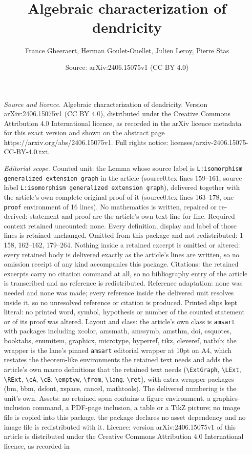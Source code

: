 \documentclass[10pt,a4paper]{amsart}
\title[Algebraic characterization of dendricity]{Algebraic characterization of dendricity}
\author{France Gheeraert, Herman Goulet-Ouellet, Julien Leroy, Pierre Stas}
\date{Source: arXiv:2406.15075v1 (CC BY 4.0)}
\begin{document}
\maketitle

\noindent\emph{Source and licence.} Algebraic characterization of dendricity. Version arXiv:2406.15075v1 (CC BY 4.0), distributed under the Creative Commons Attribution 4.0 International licence, as recorded in the arXiv licence metadata for this exact version and shown on the abstract page https://arxiv.org/abs/2406.15075v1. Full rights notice: licenses/arxiv-2406.15075-CC-BY-4.0.txt.\par\smallskip

\noindent\textit{Editorial scope.} Counted unit: the Lemma whose source label is \texttt{L:isomorphism generalized extension graph} in the article (source0.tex lines 159--161, source label \texttt{L:isomorphism generalized extension graph}), delivered together with the article's own complete original proof of it (source0.tex lines 163--178, one \texttt{proof} environment of 16 lines). No mathematics is written, repaired or re-derived: statement and proof are the article's own text line for line. Required context retained uncounted: none. Every definition, display and label of those lines is retained unchanged. Omitted from this package and not redistributed: 1--158, 162--162, 179--264. Nothing inside a retained excerpt is omitted or altered: every retained body is delivered exactly as the article's lines are written, so no omission receipt of any kind accompanies this package. Citations: the retained excerpts carry no citation command at all, so no bibliography entry of the article is transcribed and no reference is redistributed. Reference adaptation: none was needed and none was made; every reference inside the delivered unit resolves inside it, so no unresolved reference or citation is produced. Printed slips kept literal: no printed word, symbol, hypothesis or number of the counted statement or of its proof was altered. Layout and class: the article's own class is \texttt{amsart} with packages including xcolor, amsmath, amssymb, amsthm, doi, csquotes, booktabs, enumitem, graphicx, microtype, hyperref, tikz, cleveref, natbib; the wrapper is the lane's pinned \texttt{amsart} editorial wrapper at 10pt on A4, which restates the theorem-like environments the retained text needs and adds the article's own macro definitions that the retained text needs (\texttt{\textbackslash ExtGraph}, \texttt{\textbackslash LExt}, \texttt{\textbackslash RExt}, \texttt{\textbackslash cA}, \texttt{\textbackslash cB}, \texttt{\textbackslash emptyw}, \texttt{\textbackslash from}, \texttt{\textbackslash lang}, \texttt{\textbackslash ret}), with extra wrapper packages (bm, bbm, dsfont, xspace, cancel, mathtools). The delivered numbering is the unit's own. Assets: no retained span contains a figure environment, a graphics-inclusion command, a PDF-page inclusion, a table or a TikZ picture; no image file is copied into this package, the package declares no asset dependency and no image file is redistributed with it. Licence: version arXiv:2406.15075v1 of this article is distributed under the Creative Commons Attribution 4.0 International licence, as recorded in 
\end{document}

